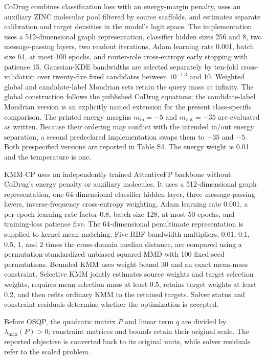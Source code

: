 CoDrug combines classification loss with an energy-margin penalty, uses an auxiliary ZINC molecular pool filtered by source scaffolds, and estimates separate calibration and target densities in the model's logit space. The implementation uses a 512-dimensional graph representation, classifier hidden sizes 256 and 8, two message-passing layers, two readout iterations, Adam learning rate 0.001, batch size 64, at most 100 epochs, and router-role cross-entropy early stopping with patience 15. Gaussian-KDE bandwidths are selected separately by ten-fold cross-validation over twenty-five fixed candidates between $10^{-1.3}$ and 10. Weighted global and candidate-label Mondrian sets retain the query mass at infinity. The global construction follows the published CoDrug equations; the candidate-label Mondrian version is an explicitly named extension for the present class-specific comparison. The printed energy margins $m_{\mathrm{in}}=-5$ and $m_{\mathrm{out}}=-35$ are evaluated as written. Because their ordering may conflict with the intended in/out energy separation, a second predeclared implementation swaps them to $-35$ and $-5$. Both prespecified versions are reported in Table S4. The energy weight is 0.01 and the temperature is one.

KMM-CP uses an independently trained AttentiveFP backbone without CoDrug's energy penalty or auxiliary molecules. It uses a 512-dimensional graph representation, one 64-dimensional classifier hidden layer, three message-passing layers, inverse-frequency cross-entropy weighting, Adam learning rate 0.001, a per-epoch learning-rate factor 0.8, batch size 128, at most 50 epochs, and training-loss patience five. The 64-dimensional penultimate representation is supplied to kernel mean matching. Five RBF bandwidth multipliers, 0.01, 0.1, 0.5, 1, and 2 times the cross-domain median distance, are compared using a permutation-standardized unbiased squared MMD with 100 fixed-seed permutations. Bounded KMM uses weight bound 30 and an exact mean-mass constraint. Selective KMM jointly estimates source weights and target selection weights, requires mean selection mass at least 0.5, retains target weights at least 0.2, and then refits ordinary KMM to the retained targets. Solver status and constraint residuals determine whether the optimization is accepted.

Before OSQP, the quadratic matrix $P$ and linear term $q$ are divided by $\lambda_{\max}(P)>0$; constraint matrices and bounds retain their original scale. The reported objective is converted back to its original units, while solver residuals refer to the scaled problem.

